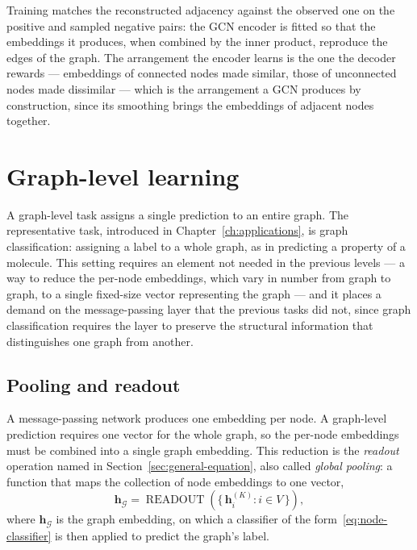 Training matches the reconstructed adjacency against the observed one on the
positive and sampled negative pairs: the GCN
encoder is fitted so that the embeddings it produces, when combined by the inner
product, reproduce the edges of the graph. The arrangement the encoder learns is
the one the decoder rewards --- embeddings of connected nodes made similar, those
of unconnected nodes made dissimilar --- which is the arrangement a GCN
produces by construction, since its smoothing brings the embeddings of adjacent
nodes together.

\section{Graph-level learning}
\label{sec:graph-level-arch}

A graph-level task assigns a single prediction to an entire graph. The
representative task, introduced in Chapter~\ref{ch:applications}, is graph
classification: assigning a label to a whole graph, as in predicting a property of
a molecule. This setting requires an element not needed in the previous levels --- a
way to reduce the per-node embeddings, which vary in number from graph to graph,
to a single fixed-size vector representing the graph --- and it places a demand on the
message-passing layer that the previous tasks did not, since graph classification requires 
the layer to preserve the structural information that distinguishes one graph from another.

\subsection{Pooling and readout}
\label{sec:pooling-readout}

A message-passing network produces one embedding per node. A graph-level
prediction requires one vector for the whole graph, so the per-node embeddings must
be combined into a single graph embedding. This reduction is the \textit{readout}
operation named in Section~\ref{sec:general-equation}, also called \textit{global
pooling}: a function that maps the collection of node embeddings to one vector,
\begin{equation}
  \mathbf{h}_{\mathcal{G}}
    = \operatorname{READOUT}\!\left(
        \{\, \mathbf{h}_i^{(K)} : i \in V \,\}
      \right),
  \label{eq:readout}
\end{equation}
where $\mathbf{h}_{\mathcal{G}}$ is the graph embedding, on which a classifier of
the form~\eqref{eq:node-classifier} is then applied to predict the graph's label.

